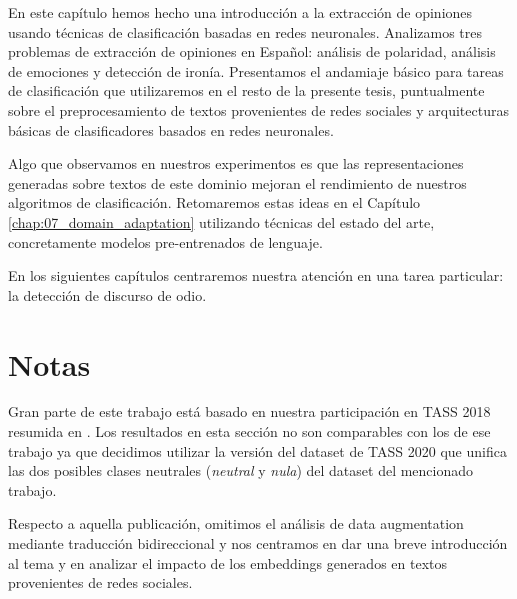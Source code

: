 En este capítulo hemos hecho una introducción a la extracción de opiniones usando técnicas de clasificación basadas en redes neuronales. Analizamos tres problemas de extracción de opiniones en Español: análisis de polaridad, análisis de emociones y detección de ironía. Presentamos el andamiaje básico para tareas de clasificación que utilizaremos en el resto de la presente tesis, puntualmente sobre el preprocesamiento de textos provenientes de redes sociales y arquitecturas básicas de clasificadores basados en redes neuronales.

Algo que observamos en nuestros experimentos es que las representaciones generadas sobre textos de este dominio mejoran el rendimiento de nuestros algoritmos de clasificación. Retomaremos estas ideas en el Capítulo \ref{chap:07_domain_adaptation} utilizando técnicas del estado del arte, concretamente modelos pre-entrenados de lenguaje.

En los siguientes capítulos centraremos nuestra atención en una tarea particular: la detección de discurso de odio.

\section{Notas}

Gran parte de este trabajo está basado en nuestra participación en TASS 2018 \cite{overview_tass2018} resumida en \citet{atalaya_tass2018}. Los resultados en esta sección no son comparables con los de ese trabajo ya que decidimos utilizar la versión del dataset de TASS 2020 \cite{garcia2020overview} que unifica las dos posibles clases neutrales (\emph{neutral} y \emph{nula}) del dataset del mencionado trabajo.

Respecto a aquella publicación, omitimos el análisis de data augmentation mediante traducción bidireccional y nos centramos en dar una breve introducción al tema y en analizar el impacto de los embeddings generados en textos provenientes de redes sociales.
